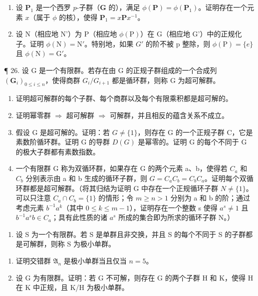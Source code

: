 \begin{enumerate}
\def\labelenumi{(\alph{enumi})}
\item
  设 \(\mathbf{P}_1\) 是一个西罗 \(p\)-子群（\(\mathbf{G}\) 的），满足 \(\phi(\mathbf{P}) = \phi(\mathbf{P}_1)\)。证明存在一个元素 \(x\)（属于 \(\phi\) 的核），使得 \(\mathbf{P}_1 = x\mathbf{P}x^{-1}\)。
\item
  设 N（相应地 N'）为 P（相应地 \(\phi(\mathrm{P})\)）在 G（相应地 G'）中的正规化子。证明 \(\phi(\mathrm{N}) = \mathrm{N}'\)。特别地，如果 \(G'\) 的阶不被 p 整除，则 \(\phi(\mathrm{P}) = \{e\}\) 且 \(\phi(\mathrm{N}) = \mathrm{G}'\)。
\end{enumerate}

¶ 26. 设 G 是一个有限群。若存在由 G 的正规子群组成的一个合成列 \((\mathbf{G}_{i})_{0\leqslant i\leqslant n}\)，使得商群 \(G_{i}/G_{i+1}\) 都是循环群，则称 G 为超可解群。

\begin{enumerate}
\def\labelenumi{(\alph{enumi})}
\item
  证明超可解群的每个子群、每个商群以及每个有限乘积都是超可解的。
\item
  证明幂零群 \(\Rightarrow\) 超可解群 \(\Rightarrow\) 可解群，并且相反的蕴含关系不成立。
\item
  假设 G 是超可解的。证明：若 \(G \neq \{1\}\)，则存在 G 的一个正规子群 C，它是素数阶循环群。证明 G 的导群 \(D(G)\) 是幂零的。证明 G 的每个不同于 G 的极大子群都有素数指数。
\item
  一个有限群 G 称为双循环群，如果存在 G 的两个元素 a、b，使得若 \(C_{a}\) 和 \(C_{b}\) 分别表示由 a 和 b 生成的循环子群，则 \(G = C_{a}C_{b} = C_{b}C_{a}\)。证明每个双循环群都是超可解群。（将其归结为证明 G 中存在一个正规循环子群 \(N \neq \{1\}\)。可以只注意 \(C_{a} \cap C_{b} = \{1\}\) 的情形；令 \(m \geqslant n > 1\) 分别为 a 和 b 的阶；通过考虑元素 \(b^{-1}a^{k}\)（其中 \(0 \leqslant k \leqslant m - 1\)），证明存在一个整数 s 使得 \(a^{s} \neq 1\) 且 \(b^{-1}a^{s}b \in C_{a}\)；具有此性质的诸 \(a^{s}\) 所成的集合即为所求的循环子群 N。）
\end{enumerate}

\begin{enumerate}
\def\labelenumi{\arabic{enumi}。}
\setcounter{enumi}{26}
\tightlist
\item
  设 S 为一个有限群。若 S 是单群且非交换，并且 S 的每个不同于 S 的子群都是可解群，则称 S 为极小单群。
\end{enumerate}

\begin{enumerate}
\def\labelenumi{(\alph{enumi})}
\item
  证明交错群 \(\mathfrak{A}_n\) 是极小单群当且仅当 \(n = 5\)。
\item
  设 G 为有限群。证明：若 G 不可解，则存在 G 的两个子群 H 和 K，使得 H 在 K 中正规，且 K/H 为极小单群。
\end{enumerate}

